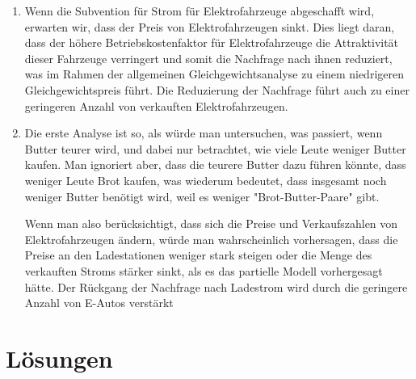 \begin{solution}
	\begin{enumerate}
		\item Wenn die Subvention für Strom für Elektrofahrzeuge abgeschafft wird, erwarten wir, dass der Preis von Elektrofahrzeugen sinkt. Dies liegt daran, dass der höhere Betriebskostenfaktor für Elektrofahrzeuge die Attraktivität dieser Fahrzeuge verringert und somit die Nachfrage nach ihnen reduziert, was im Rahmen der allgemeinen Gleichgewichtsanalyse zu einem niedrigeren Gleichgewichtspreis führt. Die Reduzierung der Nachfrage führt auch zu einer geringeren Anzahl von verkauften Elektrofahrzeugen.
		\item Die erste Analyse ist so, als würde man untersuchen, was passiert, wenn Butter teurer wird, und dabei nur betrachtet, wie viele Leute weniger Butter kaufen. Man ignoriert aber, dass die teurere Butter dazu führen könnte, dass weniger Leute Brot kaufen, was wiederum bedeutet, dass insgesamt noch weniger Butter benötigt wird, weil es weniger "Brot-Butter-Paare" gibt.

		      Wenn man also berücksichtigt, dass sich die Preise und Verkaufszahlen von Elektrofahrzeugen ändern, würde man wahrscheinlich vorhersagen, dass die Preise an den Ladestationen weniger stark steigen oder die Menge des verkauften Stroms stärker sinkt, als es das partielle Modell vorhergesagt hätte. Der Rückgang der Nachfrage nach Ladestrom wird durch die geringere Anzahl von E-Autos verstärkt
	\end{enumerate}

\end{solution}


\clearpage
\section{Lösungen}

\printsolutions
